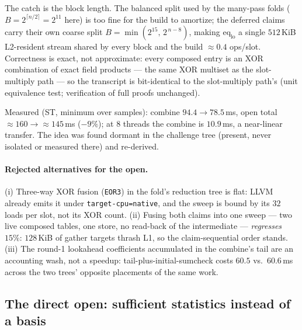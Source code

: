 \documentclass[11pt]{article}
\newcommand{\code}[1]{\texttt{#1}}
\begin{document}
The catch is the block length. The balanced split used by the many-pass
folds ($B = 2^{\lceil n/2\rceil} = 2^{11}$ here) is too fine for the build to
amortize; the deferred claims carry their own coarse split
$B = \min(2^{15},\,2^{\,n-8})$, making $\mathrm{eq}_{\mathrm{lo}}$ a single
$512$\,KiB L2-resident stream shared by every block and the build
$\approx0.4$ ops/slot. Correctness is exact, not approximate: every composed
entry is an XOR combination of exact field products --- the same XOR multiset
as the slot-multiply path --- so the transcript is bit-identical to the
slot-multiply path's (unit equivalence test; verification of full proofs
unchanged).

Measured (ST, minimum over samples): combine $94.4\to78.5\,$ms, open total
$\approx160\to\approx145\,$ms ($-9\%$); at $8$ threads the combine is
$10.9\,$ms, a near-linear transfer. The idea was found dormant in the
challenge tree (present, never isolated or measured there) and re-derived.

\paragraph{Rejected alternatives for the open.}
(i) Three-way XOR fusion (\code{EOR3}) in the fold's reduction tree is flat:
LLVM already emits it under \code{target-cpu=native}, and the sweep is bound
by its $32$ loads per slot, not its XOR count. (ii) Fusing both claims into
one sweep --- two live composed tables, one store, no read-back of the
intermediate --- \emph{regresses} $15\%$: $128$\,KiB of gather targets thrash
L1, so the claim-sequential order stands. (iii) The round-1 lookahead
coefficients accumulated in the combine's tail are an accounting wash, not a
speedup: tail-plus-initial-sumcheck costs $60.5$ vs.\ $60.6\,$ms across the
two trees' opposite placements of the same work.

\subsection{The direct open: sufficient statistics instead of a basis}
\label{sec:directopen}
\end{document}
